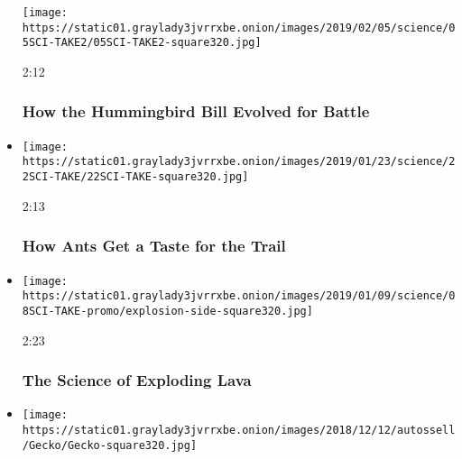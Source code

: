\begin{itemize}
  \texttt{[image: https://static01.graylady3jvrrxbe.onion/images/2019/02/05/science/05SCI-TAKE2/05SCI-TAKE2-square320.jpg]}

  2:12

  \hypertarget{how-the-hummingbird-bill-evolved-for-battle}{%
  \subsubsection{How the Hummingbird Bill Evolved for
  Battle}\label{how-the-hummingbird-bill-evolved-for-battle}}
\item
  \href{https://www.nytimes3xbfgragh.onion/video/science/100000006261057/how-ants-get-a-taste-for-the-trail.html?action=click\&module=video-series-bar\&region=header\&pgtype=Article\&playlistId=video/sciencetake}{}

  \texttt{[image: https://static01.graylady3jvrrxbe.onion/images/2019/01/23/science/22SCI-TAKE/22SCI-TAKE-square320.jpg]}

  2:13

  \hypertarget{how-ants-get-a-taste-for-the-trail}{%
  \subsubsection{How Ants Get a Taste for the
  Trail}\label{how-ants-get-a-taste-for-the-trail}}
\item
  \href{https://www.nytimes3xbfgragh.onion/video/science/100000006275847/the-science-of-exploding-lava.html?action=click\&module=video-series-bar\&region=header\&pgtype=Article\&playlistId=video/sciencetake}{}

  \texttt{[image: https://static01.graylady3jvrrxbe.onion/images/2019/01/09/science/08SCI-TAKE-promo/explosion-side-square320.jpg]}

  2:23

  \hypertarget{the-science-of-exploding-lava}{%
  \subsubsection{The Science of Exploding
  Lava}\label{the-science-of-exploding-lava}}
\item
  \href{https://www.nytimes3xbfgragh.onion/video/science/100000006247678/how-geckos-move-across-water.html?action=click\&module=video-series-bar\&region=header\&pgtype=Article\&playlistId=video/sciencetake}{}

  \texttt{[image: https://static01.graylady3jvrrxbe.onion/images/2018/12/12/autossell/Gecko/Gecko-square320.jpg]}


\end{itemize}
